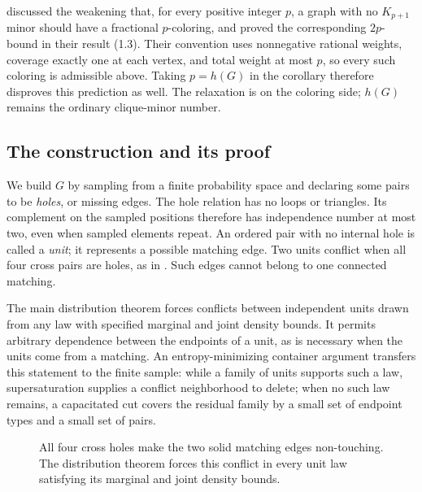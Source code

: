 \citet[p.~148]{reedseymour1998} discussed the weakening that, for every
positive integer \(p\), a graph with no \(K_{p+1}\) minor should have
a fractional \(p\)-coloring,
and proved the corresponding \(2p\)-bound in their result (1.3).
Their convention uses nonnegative rational weights, coverage exactly
one at each vertex, and total weight at most \(p\), so every such
coloring is admissible above. Taking \(p=h(G)\) in the corollary
therefore disproves this prediction as well. The relaxation is on the
coloring side; \(h(G)\) remains the ordinary clique-minor number.



\subsection{The construction and its proof}

We build \(G\) by sampling from a finite probability space and
declaring some pairs to be \emph{holes}, or missing edges. The hole
relation has no loops or triangles. Its complement on the sampled
positions therefore has independence number at most two, even when
sampled elements repeat. An ordered pair with no internal hole is
called a \emph{unit}; it represents a possible matching edge.
Two units conflict when all four cross pairs are holes, as in
. Such edges cannot belong to one connected
matching.

The main distribution theorem forces conflicts between independent
units drawn from any law with specified marginal and joint density
bounds. It permits arbitrary dependence between the endpoints of a
unit, as is necessary when the units come from a matching. An
entropy-minimizing container argument transfers this statement to the
finite sample: while a family of units supports such a law,
supersaturation supplies a conflict neighborhood to delete; when no
such law remains, a capacitated cut covers the residual family by a
small set of endpoint types and a small set of pairs.

\begin{figure}[htbp]
\centering
{}
\caption{All four cross holes make the two solid matching edges
non-touching. The distribution theorem forces this conflict in every
unit law satisfying its marginal and joint density bounds.}
\label{fig:four-holes}
\end{figure}


